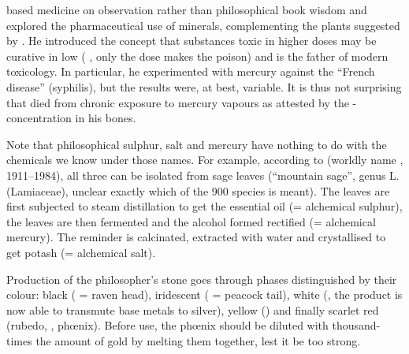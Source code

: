 \documentclass[british,final,landscape]{scrartcl}
\begin{document}
\begin{refsection}
 based medicine on observation rather than philosophical book wisdom and explored the pharmaceutical use of minerals, complementing the plants suggested by . He introduced the concept that substances toxic in higher doses may be curative in low ( \parencite{Par-74}, only the dose makes the poison) and is the father of modern toxicology. In particular, he experimented with mercury against the ``French disease'' (syphilis), but the results were, at best, variable. It is thus not surprising that  died from chronic exposure to mercury vapours as attested by the -concentration in his bones.

Note that philosophical sulphur, salt and mercury have nothing to do with the chemicals we know under those names. For example, according to  (worldly name , \num{1911}--\num{1984}), all three can be isolated from sage leaves (``mountain sage'', genus  L. (Lamiaceae), unclear exactly which of the 900 species is meant). The leaves are first subjected to steam distillation to get the essential oil (= alchemical sulphur), the leaves are then fermented and the alcohol formed rectified (= alchemical mercury). The reminder is calcinated, extracted with water and crystallised to get potash (= alchemical salt).

Production of the philosopher's stone  goes through phases distinguished by their colour: black ( = raven head), iridescent ( = peacock tail), white (, the product is now able to transmute base metals to silver), yellow () and finally scarlet red (rubedo, , phœnix). Before use, the phœnix should be diluted with thousand-times the amount of gold by melting them together, lest it be too strong.


\end{refsection}
\end{document}
